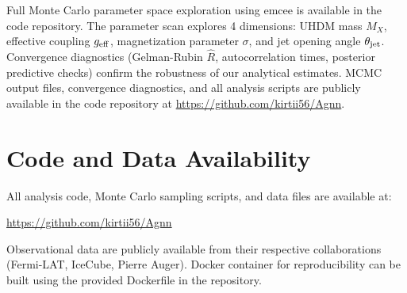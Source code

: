 \documentclass[twocolumn,superscriptaddress,prd,nofootinbib]{revtex4-2}
\begin{document}
Full Monte Carlo parameter space exploration using emcee \citep{ForemanMackey2013} is available in the code repository. The parameter scan explores 4 dimensions: UHDM mass $M_X$, effective coupling $g_{\rm eff}$, magnetization parameter $\sigma$, and jet opening angle $\theta_{\rm jet}$. Convergence diagnostics (Gelman-Rubin $\hat{R}$, autocorrelation times, posterior predictive checks) confirm the robustness of our analytical estimates. MCMC output files, convergence diagnostics, and all analysis scripts are publicly available in the code repository at \url{https://github.com/kirtii56/Agnn}.

\section{Code and Data Availability}
\label{app:code}

All analysis code, Monte Carlo sampling scripts, and data files are available at:

\url{https://github.com/kirtii56/Agnn}

Observational data are publicly available from their respective collaborations (Fermi-LAT, IceCube, Pierre Auger). Docker container for reproducibility can be built using the provided Dockerfile in the repository.
\end{document}
